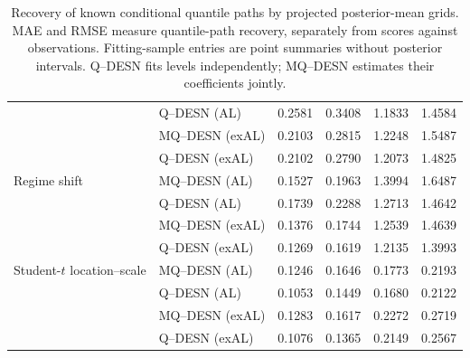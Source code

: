 \begin{table}[p]
\begin{tabular}{@{}>{\raggedright\arraybackslash}p{}>{\raggedright\arraybackslash}p{}rrrr@{}}
 & Q--DESN (AL) & 0.2581 & 0.3408 & 1.1833 & 1.4584 \\
 & MQ--DESN (exAL) & 0.2103 & 0.2815 & 1.2248 & 1.5487 \\
 & Q--DESN (exAL) & 0.2102 & 0.2790 & 1.2073 & 1.4825 \\
\addlinespace[2pt]
Regime shift & MQ--DESN (AL) & 0.1527 & 0.1963 & 1.3994 & 1.6487 \\
 & Q--DESN (AL) & 0.1739 & 0.2288 & 1.2713 & 1.4642 \\
 & MQ--DESN (exAL) & 0.1376 & 0.1744 & 1.2539 & 1.4639 \\
 & Q--DESN (exAL) & 0.1269 & 0.1619 & 1.2135 & 1.3993 \\
\addlinespace[2pt]
Student-\(t\) location--scale & MQ--DESN (AL) & 0.1246 & 0.1646 & 0.1773 & 0.2193 \\
 & Q--DESN (AL) & 0.1053 & 0.1449 & 0.1680 & 0.2122 \\
 & MQ--DESN (exAL) & 0.1283 & 0.1617 & 0.2272 & 0.2719 \\
 & Q--DESN (exAL) & 0.1076 & 0.1365 & 0.2149 & 0.2567 \\
\bottomrule
\end{tabular}
\caption{Recovery of known conditional quantile paths by projected posterior-mean grids. MAE and RMSE measure quantile-path recovery, separately from scores against observations. Fitting-sample entries are point summaries without posterior intervals. Q--DESN fits levels independently; MQ--DESN estimates their coefficients jointly.}
\label{tab:joint-qdesn-pure-desn-v2-oracle}
\end{table}
